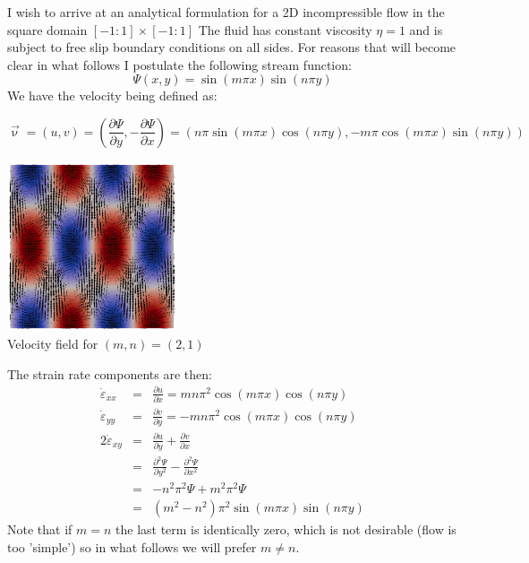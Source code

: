 I wish to arrive at an analytical formulation for a 2D incompressible flow in the square domain $[-1:1]\times[-1:1]$
The fluid has constant viscosity $\eta=1$ and is subject to free slip boundary conditions on all sides.
For reasons that will become clear in what follows I postulate the following stream function:
\begin{equation}
\Psi(x,y)=\sin( m \pi x)\sin( n\pi y)
\end{equation}
We have the velocity being defined as:
\begin{mdframed}[backgroundcolor=blue!5]
\begin{equation}
{\vec \upnu} = (u,v) = \left( \frac{\partial \Psi}{\partial y},-\frac{\partial \Psi}{\partial x} \right) 
= (n \pi \sin (m\pi x)\cos(n\pi y),-m\pi \cos(m\pi x)\sin (n\pi y))
\end{equation}
\end{mdframed}

\begin{center}
\includegraphics[width=5cm]{images/mms/square_streamfunction/vel_2x1}\\
{\captionfont Velocity field for $(m,n)=(2,1)$}
\end{center}

The strain rate components are then:
\begin{eqnarray}
\dot\varepsilon_{xx} &=&  \frac{\partial u}{\partial x} = mn \pi^ 2  \cos (m\pi x)\cos(n\pi y)   \\
\dot\varepsilon_{yy} &=&  \frac{\partial v}{\partial y} = -mn \pi^ 2  \cos (m\pi x)\cos(n\pi y)  \\
2\dot\varepsilon_{xy} &=&  \frac{\partial u}{\partial y} +  \frac{\partial v}{\partial x}    \\
&=&  \frac{\partial^2 \Psi}{\partial y^2} -  \frac{\partial^2 \Psi}{\partial x^2}    \\
&=& -n^2\pi^2 \Psi + m^2 \pi^2 \Psi \\
&=& (m^2-n^2) \pi^2   \sin( m \pi x)\sin( n\pi y)
\end{eqnarray}
Note that if $m=n$ the last term is identically zero, which is not desirable 
(flow is too 'simple')
so in what follows we will prefer $m\neq n$.

